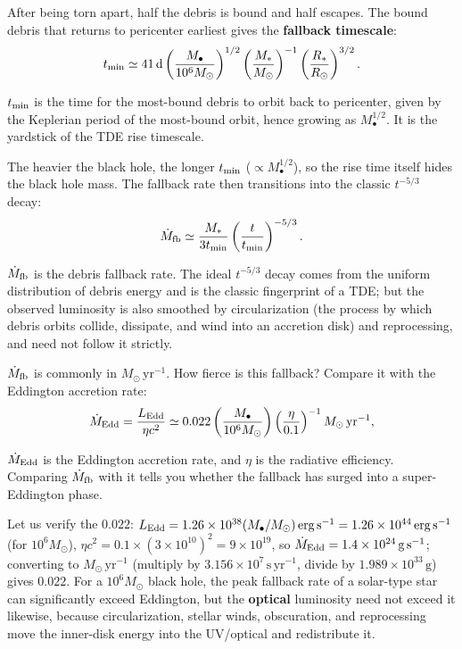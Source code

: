 After being torn apart, half the debris is bound and half escapes. The bound debris that returns to pericenter earliest gives the \textbf{fallback timescale}:
\begin{equation}
  t_{\rm min}\simeq
  41\,{\rm d}
  \left(\frac{M_\bullet}{10^6M_\odot}\right)^{1/2}
  \left(\frac{M_\ast}{M_\odot}\right)^{-1}
  \left(\frac{R_\ast}{R_\odot}\right)^{3/2}.
  \label{eq:e20-tde-fallback-time}
\end{equation}
\begin{formulaexplain}
\(t_{\rm min}\) is the time for the most-bound debris to orbit back to pericenter, given by the Keplerian period of the most-bound orbit, hence growing as \(M_\bullet^{1/2}\). It is the yardstick of the TDE rise timescale.
\end{formulaexplain}
The heavier the black hole, the longer \(t_{\rm min}\) (\(\propto M_\bullet^{1/2}\)), so the rise time itself hides the black hole mass. The fallback rate then transitions into the classic \(t^{-5/3}\) decay:
\begin{equation}
  \dot M_{\rm fb}\simeq
  \frac{M_\ast}{3t_{\rm min}}
  \left(\frac{t}{t_{\rm min}}\right)^{-5/3}.
  \label{eq:e20-tde-fallback-rate}
\end{equation}
\begin{formulaexplain}
\(\dot M_{\rm fb}\) is the debris fallback rate. The ideal \(t^{-5/3}\) decay comes from the uniform distribution of debris energy and is the classic fingerprint of a TDE; but the observed luminosity is also smoothed by circularization (the process by which debris orbits collide, dissipate, and wind into an accretion disk) and reprocessing, and need not follow it strictly.
\end{formulaexplain}
\(\dot M_{\rm fb}\) is commonly in \(M_\odot\,\mathrm{yr^{-1}}\). How fierce is this fallback? Compare it with the Eddington accretion rate:
\begin{equation}
  \dot M_{\rm Edd}
  =
  \frac{L_{\rm Edd}}{\eta c^2}
  \simeq
  0.022
  \left(\frac{M_\bullet}{10^6M_\odot}\right)
  \left(\frac{\eta}{0.1}\right)^{-1}
  M_\odot\,{\rm yr^{-1}} ,
  \label{eq:e20-eddington-rate}
\end{equation}
\begin{formulaexplain}
\(\dot M_{\rm Edd}\) is the Eddington accretion rate, and \(\eta\) is the radiative efficiency. Comparing \(\dot M_{\rm fb}\) with it tells you whether the fallback has surged into a super-Eddington phase.
\end{formulaexplain}
Let us verify the \(0.022\): \(L_{\rm Edd}=1.26\times10^{38}(M_\bullet/M_\odot)\,\mathrm{erg\,s^{-1}}=1.26\times10^{44}\,\mathrm{erg\,s^{-1}}\) (for \(10^6M_\odot\)), \(\eta c^2=0.1\times(3\times10^{10})^2=9\times10^{19}\), so \(\dot M_{\rm Edd}=1.4\times10^{24}\,\mathrm{g\,s^{-1}}\); converting to \(M_\odot\,\mathrm{yr^{-1}}\) (multiply by \(3.156\times10^7\,\mathrm{s\,yr^{-1}}\), divide by \(1.989\times10^{33}\,\mathrm{g}\)) gives \(0.022\). For a \(10^6M_\odot\) black hole, the peak fallback rate of a solar-type star can significantly exceed Eddington, but the \textbf{optical} luminosity need not exceed it likewise, because circularization, stellar winds, obscuration, and reprocessing move the inner-disk energy into the UV/optical and redistribute it.

